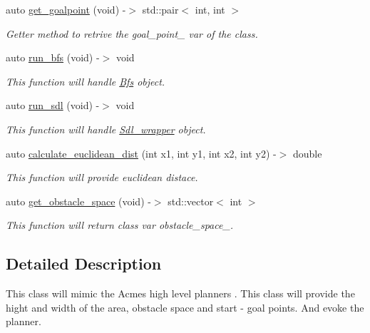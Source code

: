 \begin{DoxyCompactItemize}
auto \hyperlink{class_obstacle__generator_a7a741dd1a0797e1c560063fed40c5d49}{get\+\_\+goalpoint} (void) -\/$>$ std\+::pair$<$ int, int $>$
\begin{DoxyCompactList}\small\item\em Getter method to retrive the goal\+\_\+point\+\_\+ var of the class. \end{DoxyCompactList}\item 
auto \hyperlink{class_obstacle__generator_a58c2296becc0dea68389627dac19866c}{run\+\_\+bfs} (void) -\/$>$ void
\begin{DoxyCompactList}\small\item\em This function will handle \hyperlink{class_bfs}{Bfs} object. \end{DoxyCompactList}\item 
auto \hyperlink{class_obstacle__generator_ae6c0fa1079d03da92ed755616f60f0fd}{run\+\_\+sdl} (void) -\/$>$ void
\begin{DoxyCompactList}\small\item\em This function will handle \hyperlink{class_sdl__wrapper}{Sdl\+\_\+wrapper} object. \end{DoxyCompactList}\item 
auto \hyperlink{class_obstacle__generator_a39a8327cc53304fba5091b55c5967ef3}{calculate\+\_\+euclidean\+\_\+dist} (int x1, int y1, int x2, int y2) -\/$>$ double
\begin{DoxyCompactList}\small\item\em This function will provide euclidean distace. \end{DoxyCompactList}\item 
auto \hyperlink{class_obstacle__generator_a5a8d87ae23a81a3697e2f23134781fa2}{get\+\_\+obstacle\+\_\+space} (void) -\/$>$ std\+::vector$<$ int $>$
\begin{DoxyCompactList}\small\item\em This function will return class var obstacle\+\_\+space\+\_\+. \end{DoxyCompactList}\end{DoxyCompactItemize}


\subsection{Detailed Description}
This class will mimic the Acme\textquotesingle{}s high level planner\textquotesingle{}s . This class will provide the hight and width of the area, obstacle space and start -\/ goal points. And evoke the planner. 

